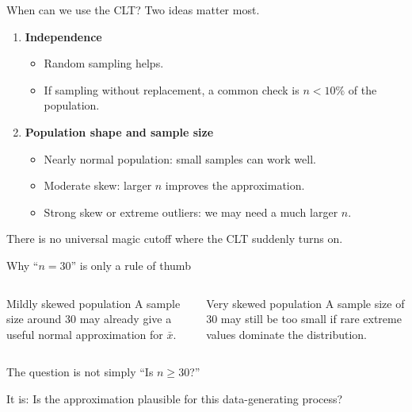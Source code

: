 \documentclass[11pt,aspectratio=169]{beamer}
\begin{document}
\begin{frame}{When can we use the CLT?}
Two ideas matter most.

\begin{enumerate}
  \item \textbf{Independence}
  \begin{itemize}
    \item Random sampling helps.
    \item If sampling without replacement, a common check is $n<10\%$ of the population.
  \end{itemize}

  \item \textbf{Population shape and sample size}
  \begin{itemize}
    \item Nearly normal population: small samples can work well.
    \item Moderate skew: larger $n$ improves the approximation.
    \item Strong skew or extreme outliers: we may need a much larger $n$.
  \end{itemize}
\end{enumerate}

\vfill
\alert{There is no universal magic cutoff where the CLT suddenly turns on.}
\end{frame}

\begin{frame}{Why ``$n=30$'' is only a rule of thumb}
\begin{columns}[T,onlytextwidth]
\begin{block}{Mildly skewed population}
A sample size around 30 may already give a useful normal approximation for $\bar{x}$.
\end{block}
\begin{block}{Very skewed population}
A sample size of 30 may still be too small if rare extreme values dominate the distribution.
\end{block}
\end{columns}

\vspace{0.9em}
The question is not simply ``Is $n\ge30$?''

\begin{center}
\Large It is: \alert{Is the approximation plausible for this data-generating process?}
\end{center}
\end{frame}
\end{document}
